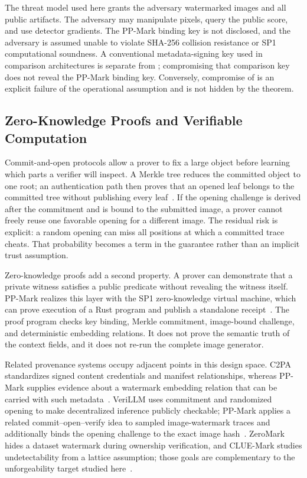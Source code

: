 The threat model used here grants the adversary watermarked images and all public
artifacts.  The adversary may manipulate pixels, query the public score, and use
detector gradients.  The PP-Mark binding key \PPSecretKey{} is not disclosed, and
the adversary is assumed unable to violate SHA-256 collision resistance or SP1
computational soundness.  A conventional metadata-signing key used in comparison
architectures is separate from \PPSecretKey{}; compromising that comparison key
does not reveal the PP-Mark binding key.  Conversely, compromise of
\PPSecretKey{} is an explicit failure of the operational assumption and is not
hidden by the theorem.

\subsection{Zero-Knowledge Proofs and Verifiable Computation}
\label{subsec:ch4-zkp-background}

Commit-and-open protocols allow a prover to fix a large object before learning
which parts a verifier will inspect.  A Merkle tree reduces the committed object
to one root; an authentication path then proves that an opened leaf belongs to the
committed tree without publishing every leaf~\cite{merkle1988signature}.  If the
opening challenge is derived after the commitment and is bound to the submitted
image, a prover cannot freely reuse one favorable opening for a different image.
The residual risk is explicit: a random opening can miss all positions at which a
committed trace cheats.  That probability becomes a term in the guarantee rather
than an implicit trust assumption.

Zero-knowledge proofs add a second property.  A prover can demonstrate that a
private witness satisfies a public predicate without revealing the witness itself.
PP-Mark realizes this layer with the SP1 zero-knowledge virtual machine, which can
prove execution of a Rust program and publish a standalone receipt~\cite{roy2024sp1}.
The proof program checks key binding, Merkle commitment, image-bound challenge,
and deterministic embedding relations.  It does not prove the semantic truth of
the context fields, and it does not re-run the complete image generator.

Related provenance systems occupy adjacent points in this design space.  C2PA
standardizes signed content credentials and manifest relationships, whereas
PP-Mark supplies evidence about a watermark embedding relation that can be carried
with such metadata~\cite{c2pa2026spec}.  VeriLLM uses commitment and randomized
opening to make decentralized inference publicly checkable; PP-Mark applies a
related commit--open--verify idea to sampled image-watermark traces and additionally
binds the opening challenge to the exact image hash~\cite{wang2025verillm}.
ZeroMark hides a dataset watermark during ownership verification, and CLUE-Mark
studies undetectability from a lattice assumption; those goals are complementary
to the unforgeability target studied here~\cite{guo2024zeromark,
shehata2024cluemark}.

